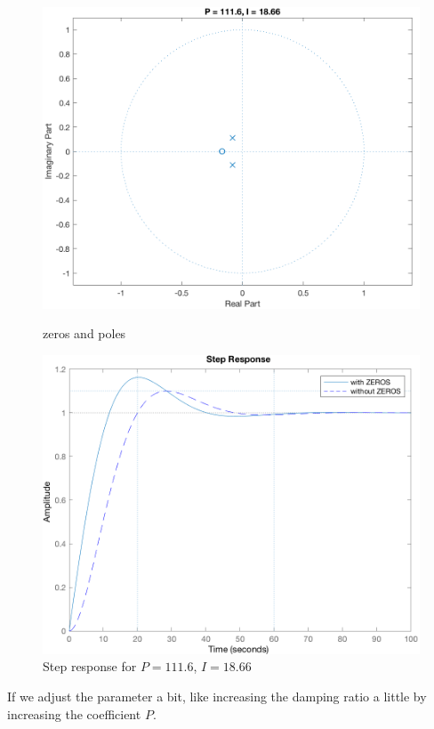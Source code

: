 \documentclass[a4paper]{article}
\begin{document}
\begin{figure}[H]
\centering
\begin{minipage}[t]{0.48\textwidth}
\centering
\includegraphics[width=\textwidth]{pic/zp1.png}
\caption{zeros and poles}
\end{minipage}
\begin{minipage}[t]{0.48\textwidth}
\centering
\includegraphics[width=\textwidth]{pic/zo1.png}
\caption{Step response for $P = 111.6$, $I = 18.66$}
\end{minipage}
\end{figure}
\noindent If we adjust the parameter a bit, like increasing the damping ratio a little by increasing the coefficient $P$. 
\end{document}
